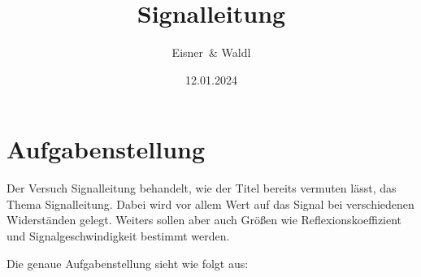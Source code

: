 \documentclass[12pt,a4paper,twoside]{article}
\begin{document}
\newcommand\laboratorynumber{2}
\title{Signalleitung}
\newcommand\supervisor{Ditlbacher, Harald}
\newcommand\groupnumber{42}

\newcommand\participantonelastname{Eisner}
\newcommand\participantonefirstname{Nico}
\newcommand\participantoneid{12214121}
\newcommand\participanttwolastname{Waldl}
\newcommand\participanttwofirstname{Philip}
\newcommand\participanttwoid{12214120}
\author{\participantonelastname \ \& \participanttwolastname}

\newcommand\degreeid{UB 033 678}
\newcommand\semester{23WS}
\date{12.01.2024}

\newcommand\coursetitle{Laborübungen 2: \\ Elektrizität, Magnetismus, Optik}

%



\tableofcontents
\newpage

\section{Aufgabenstellung} %
Der Versuch Signalleitung behandelt, wie der Titel bereits vermuten lässt, das Thema Signalleitung. Dabei wird vor allem Wert auf das Signal bei verschiedenen Widerständen gelegt. 
Weiters sollen aber auch Größen wie Reflexionskoeffizient und Signalgeschwindigkeit bestimmt werden. \newline

\noindent
Die genaue Aufgabenstellung sieht wie folgt aus: 
\end{document}

